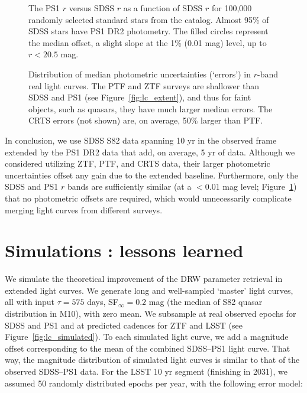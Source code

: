 \documentclass[twocolumn]{aastex62}
\begin{document}
\begin{figure}
	\caption{The PS1 $r$ versus SDSS $r$ as a function of SDSS $r$ for 100,000 randomly selected standard stars from the \citet{ivezic2007} catalog. Almost 95\% of SDSS stars have PS1 DR2 photometry. The filled circles represent the median offset, a slight slope at the 1\% (0.01 mag) level, up to $r<20.5$ mag.}
	\label{fig:offsetPS1mag}
\end{figure} 


\begin{figure}
	\caption{Distribution of median photometric uncertainties (`errors') in $r$-band real light curves. The PTF and ZTF surveys are shallower than SDSS and PS1 (see Figure~\ref{fig:lc_extent}), and thus for faint objects, such as quasars, they have much larger median errors. The CRTS errors (not shown) are, on average, 50\% larger than PTF.}
	\label{fig:lc_errors}
\end{figure} 


In conclusion, we use SDSS S82 data spanning 10 yr in the observed frame extended by the PS1 DR2 data that add, on average, 5 yr of data. Although we considered utilizing ZTF, PTF, and CRTS data, their larger photometric uncertainties offset any gain due to the extended baseline. Furthermore, only the SDSS and PS1 $r$ bands are sufficiently similar (at a ${<} 0.01$ mag level; Figure~\ref{fig:offsetPS1mag}) that no photometric offsets are required, which would unnecessarily complicate merging light curves from different surveys.
%
%
%
%
%

\section{Simulations : lessons learned}\label{sec:simulation}

We simulate the theoretical improvement of the DRW parameter retrieval in extended light curves. We generate long and well-sampled  `master' light curves, all with input $\tau = 575 $ days, SF$_{\infty} = 0.2$ mag (the median of S82 quasar distribution in M10), with zero mean.  We subsample at real observed epochs for SDSS and PS1 and at predicted cadences for ZTF and LSST  (see Figure~\ref{fig:lc_simulated}). To each simulated light curve, we add a magnitude offset corresponding to the mean of the combined SDSS--PS1 light curve. That way, the magnitude distribution of simulated light curves is similar to that of the observed SDSS--PS1 data. For the LSST 10 yr segment (finishing in 2031), we assumed 50 randomly distributed  epochs per year, with the following error model:
\end{document}
